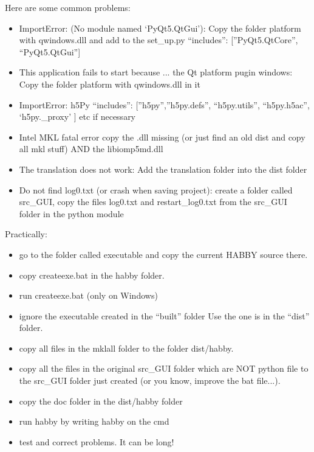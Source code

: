\documentclass[letterpaper,10pt,english]{sphinxmanual}
\begin{document}
Here are some common problems:
\begin{itemize}
\item {} 
ImportError: (No module named `PyQt5.QtGui'): Copy the folder platform with qwindows.dll and add to the set\_up.py  ``includes'': {[}''PyQt5.QtCore'', ``PyQt5.QtGui''{]}

\item {} 
This application fails to start because ... the Qt platform pugin windows: Copy the folder platform with qwindows.dll in it

\item {} 
ImportError: h5Py ``includes'': {[}''h5py'',''h5py.defs'', ``h5py.utils'', ``h5py.h5ac'', `h5py.\_proxy' {]} etc if necessary

\item {} 
Intel MKL fatal error copy the .dll missing (or just find an old dist and copy all mkl stuff) AND the libiomp5md.dll

\item {} 
The translation does not work: Add the translation folder into the dist folder

\item {} 
Do not find log0.txt (or crash when saving project): create a folder called src\_GUI, copy the files log0.txt and restart\_log0.txt from the src\_GUI folder in the python module

\end{itemize}

Practically:
\begin{itemize}
\item {} 
go to the folder called executable and copy the current HABBY source there.

\item {} 
copy createexe.bat in the habby folder.

\item {} 
run createexe.bat (only on Windows)

\item {} 
ignore the executable created in the ``built'' folder Use the one is in the ``dist'' folder.

\item {} 
copy all files in the mklall folder to the folder dist/habby.

\item {} 
copy all the files in the original src\_GUI folder which are NOT python file to the src\_GUI folder just created (or you know, improve the bat file...).

\item {} 
copy the doc folder in the dist/habby folder

\item {} 
run habby by writing habby on the cmd

\item {} 
test and correct problems. It can be long!

\end{itemize}
\end{document}
